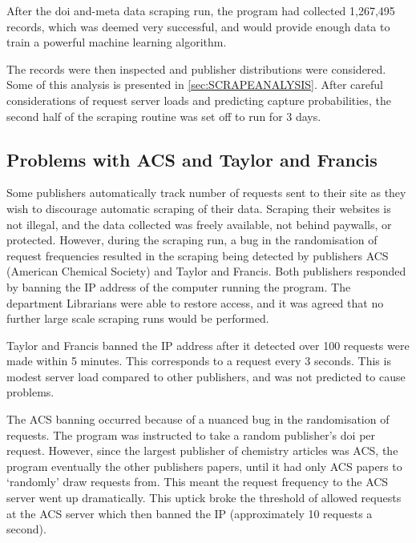 After the doi and-meta data scraping run, the program had collected 1,267,495 records, which was deemed very successful, and would provide enough data to train a powerful machine learning algorithm.

The records were then inspected and publisher distributions were considered. Some of this analysis is presented in \ref{sec:SCRAPEANALYSIS}. After careful considerations of request server loads and predicting capture probabilities, the second half of the scraping routine was set off to run for 3 days.
\label{sec:CROSSREFSCRAPE}
\subsection{Problems with ACS and Taylor and Francis}
Some publishers automatically track number of requests sent to their site as they wish to discourage automatic scraping of their data. Scraping their websites is not illegal, and the data collected was freely available, not behind paywalls, or protected. However, during the scraping run, a bug in the randomisation of request frequencies resulted in the scraping being detected by publishers ACS (American Chemical Society) and Taylor and Francis. Both publishers responded by banning the IP address of the computer running the program. The department Librarians were able to restore access, and it was agreed that no further large scale scraping runs would be performed. 

Taylor and Francis banned the IP address after it detected over 100 requests were made within 5 minutes. This corresponds to a request every 3 seconds. This is modest server load compared to other publishers, and was not predicted to cause problems.

The ACS banning occurred because of a nuanced bug in the randomisation of requests. The program was instructed to take a random publisher's doi per request. However, since the largest publisher of chemistry articles was ACS, the program eventually the other publishers papers, until it had only ACS papers to `randomly' draw requests from. This meant the request frequency to the ACS server went up dramatically. This uptick broke the threshold of allowed requests at the ACS server which then banned the IP (approximately 10 requests a second).

